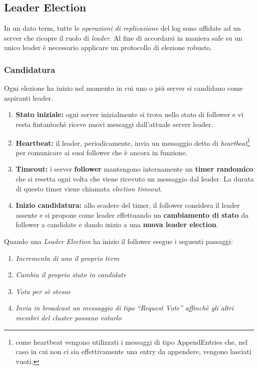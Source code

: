 \subsection{Leader Election}
\label{Leader Election}
In un dato term, tutte le \textit{operazioni di replicazione} del log sono affidate ad un server che ricopre il ruolo di \textit{leader}. Al fine di accordarsi in maniera safe su un unico leader è necessario applicare un protocollo di elezione robusto.  

	\subsubsection{Candidatura}
	Ogni elezione ha inizio nel momento in cui uno o più server si candidano come aspiranti leader.

	\begin{enumerate}
		\item{\textbf{Stato iniziale:}}	ogni server inizialmente si trova nello stato di follower e vi resta fintantochè riceve nuovi messaggi dall'attuale server leader.
		\item{\textbf{Heartbeat:}} il leader, periodicamente, invia un messaggio detto di \textit{heartbeat}\footnote{come heartbeat vengono utilizzati i messaggi di tipo AppendEntries che, nel caso in cui non ci sia effettivamente una entry da appendere, vengono lasciati vuoti.} 
		per comunicare ai suoi follower che è ancora in funzione.
		\item{\textbf{Timeout:}} i server \textbf{follower} mantengono internamente un \textbf{timer randomico} che si resetta ogni volta che viene ricevuto un messaggio dal leader. La durata di questo timer viene chiamata \textit{election timeout}.		
		\item{\textbf{Inizio candidatura:}} allo scadere del timer, il follower considera il leader assente e si propone come leader effettuando un \textbf{cambiamento di stato} da follower a candidate e dando inizio a una \textbf{nuova leader election}.
	\end{enumerate}


Quando una \textit{Leader Election} ha inizio il follower esegue i seguenti passaggi:

\begin{enumerate}
	\item{\emph{Incrementa di uno il proprio term}}
	\item{\emph{Cambia il proprio stato in candidate}}
	\item{\emph{Vota per sè stesso}}
	\item{\emph{Invia in broadcast un messaggio di tipo ``Request Vote'' affinchè gli altri membri del cluster possano votarlo}}
\end{enumerate}
 
